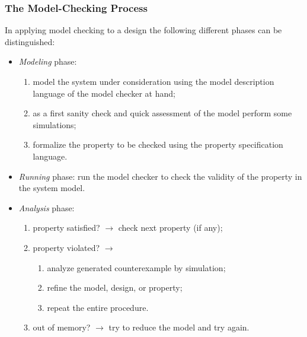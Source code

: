 \documentclass[a4paper,11pt]{article}
\begin{document}
	\setcounter{section}{1}
	\setcounter{subsection}{2}
	\subsubsection{The Model-Checking Process}
	In applying model checking to a design the 
	following different phases can be distinguished:
	\begin{itemize}
	\item \textsl{Modeling} phase: 
	\begin{enumerate}[--]
		\item model the system under consideration using the model description language of the model checker at hand; 
		\item as a first sanity check and quick assessment of the model perform some simulations; 
		\item formalize the property to be checked using the property specification language.
	\end{enumerate} 
	\item \textsl{Running} phase: run the model checker to check the validity of the property in the system
		model. 
		\item \textsl{Analysis} phase: 
	\begin{enumerate}[--]
		\item property satisfied? $\rightarrow$ check next property (if any); 
		\item property violated? $\rightarrow$
		\begin{enumerate}[1.]
			\item analyze generated counterexample by simulation; 
			\item refine the model, design, or property; 
			\item repeat the entire procedure. 
		\end{enumerate} 
		\item out of memory? $\rightarrow$ try to reduce the model and try again.
		
	\end{enumerate}
\end{itemize}
\end{document}
